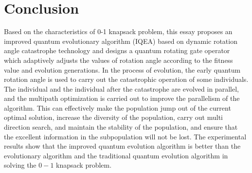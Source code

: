 \documentclass[10pt]{article}
\begin{document}
\section{Conclusion}
Based on the characteristics of 0-1 knapsack problem, this essay proposes an improved quantum evolutionary algorithm (IQEA) based on dynamic rotation angle catastrophe technology and designs a quantum rotating gate operator which adaptively adjusts the values of rotation angle according to the fitness value and evolution generations. In the process of evolution, the early quantum rotation angle is used to carry out the catastrophic operation of some individuals. The individual and the individual after the catastrophe are evolved in parallel, and the multipath optimization is carried out to improve the parallelism of the algorithm. This can effectively make the population jump out of the current optimal solution, increase the diversity of the population, carry out multi direction search, and maintain the stability of the population, and ensure that the excellent information in the subpopulation will not be lost. The experimental results show that the improved quantum evolution algorithm is better than the evolutionary algorithm and the traditional quantum evolution algorithm in solving the $0-1$ knapsack problem.
\end{document}
